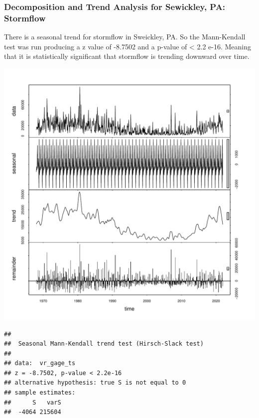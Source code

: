 \documentclass[
  12pt,
]{article}
\begin{document}
\newpage

\hypertarget{decomposition-and-trend-analysis-for-sewickley-pa-stormflow}{%
\subsubsection{Decomposition and Trend Analysis for Sewickley, PA:
Stormflow}\label{decomposition-and-trend-analysis-for-sewickley-pa-stormflow}}

There is a seasonal trend for stormflow in Sweickley, PA. So the
Mann-Kendall test was run producing a z value of -8.7502 and a p-value
of \textless{} 2.2 e-16. Meaning that it is statistically significant
that stormflow is trending downward over time.

\includegraphics{Elliott_WDA_Project_files/figure-latex/seasonality_3-1.pdf}

\begin{verbatim}
## 
##  Seasonal Mann-Kendall trend test (Hirsch-Slack test)
## 
## data:  vr_gage_ts
## z = -8.7502, p-value < 2.2e-16
## alternative hypothesis: true S is not equal to 0
## sample estimates:
##      S   varS 
##  -4064 215604
\end{verbatim}
\end{document}
